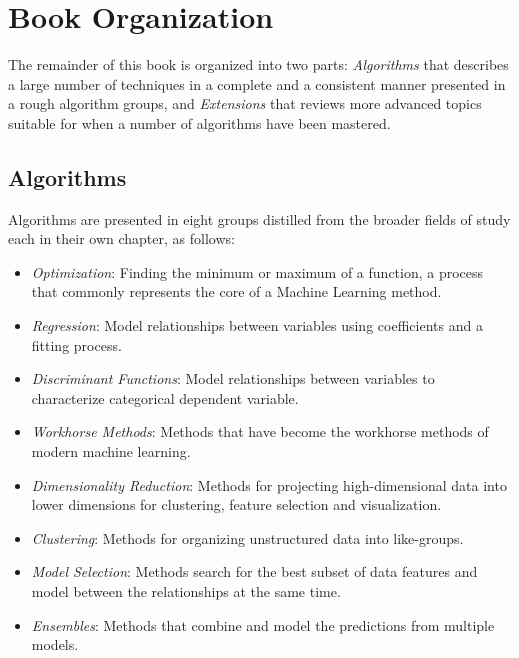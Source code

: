 
\section{Book Organization} 
\label{intro:organization}
The remainder of this book is organized into two parts: \emph{Algorithms} that describes a large number of techniques in a complete and a consistent manner presented in a rough algorithm groups, and \emph{Extensions} that reviews more advanced topics suitable for when a number of algorithms have been mastered.

% 
%
\subsection{Algorithms}
Algorithms are presented in eight groups distilled from the broader fields of study each in their own chapter, as follows: 

\begin{itemize}
	\item \emph{Optimization}: Finding the minimum or maximum of a function, a process that commonly represents the core of a Machine Learning method.
	\item \emph{Regression}: Model relationships between variables using coefficients and a fitting process.
	\item \emph{Discriminant Functions}:	Model relationships between variables to characterize categorical dependent variable.
	\item \emph{Workhorse Methods}: Methods that have become the workhorse methods of modern machine learning.
	\item \emph{Dimensionality Reduction}: Methods for projecting high-dimensional data into lower dimensions for clustering, feature selection and visualization.
	\item \emph{Clustering}: Methods for organizing unstructured data into like-groups.
	\item \emph{Model Selection}: Methods search for the best subset of data features and model between the relationships at the same time.
	\item \emph{Ensembles}:	Methods that combine and model the predictions from multiple models.
\end{itemize}

